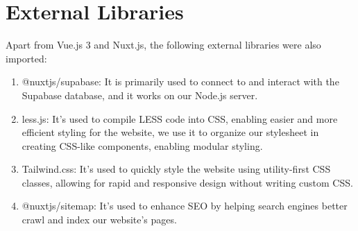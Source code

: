 
\section{External Libraries}
Apart from Vue.js 3 and Nuxt.js, the following external libraries were also imported:
\begin{enumerate}
	\item @nuxtjs/supabase: It is primarily used to connect to and interact with the Supabase database, and it works on our Node.js server.
	\item less.js: It's used to compile LESS code into CSS, enabling easier and more efficient styling for the website, we use it to organize our stylesheet in creating CSS-like components, enabling modular styling.
	\item Tailwind.css: It's used to quickly style the website using utility-first CSS classes, allowing for rapid and responsive design without writing custom CSS.
	\item @nuxtjs/sitemap: It's used to enhance SEO by helping search engines better crawl and index our website's pages.
\end{enumerate}